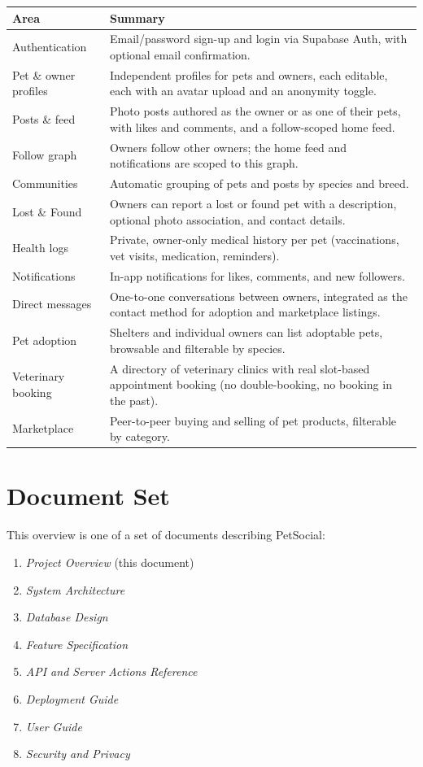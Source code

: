 \documentclass[11pt,a4paper]{article}
\begin{document}
\begin{longtable}{@{}p{4.5cm}p{9.5cm}@{}}
\toprule
\textbf{Area} & \textbf{Summary} \\
\midrule
\endhead
Authentication & Email/password sign-up and login via Supabase Auth, with optional
  email confirmation. \\
Pet \& owner profiles & Independent profiles for pets and owners, each editable, each
  with an avatar upload and an anonymity toggle. \\
Posts \& feed & Photo posts authored as the owner or as one of their pets, with likes
  and comments, and a follow-scoped home feed. \\
Follow graph & Owners follow other owners; the home feed and notifications are scoped
  to this graph. \\
Communities & Automatic grouping of pets and posts by species and breed. \\
Lost \& Found & Owners can report a lost or found pet with a description, optional
  photo association, and contact details. \\
Health logs & Private, owner-only medical history per pet (vaccinations, vet visits,
  medication, reminders). \\
Notifications & In-app notifications for likes, comments, and new followers. \\
Direct messages & One-to-one conversations between owners, integrated as the contact
  method for adoption and marketplace listings. \\
Pet adoption & Shelters and individual owners can list adoptable pets, browsable and
  filterable by species. \\
Veterinary booking & A directory of veterinary clinics with real slot-based appointment
  booking (no double-booking, no booking in the past). \\
Marketplace & Peer-to-peer buying and selling of pet products, filterable by category. \\
\bottomrule
\end{longtable}

\section{Document Set}
This overview is one of a set of documents describing PetSocial:
\begin{enumerate}[leftmargin=*]
  \item \emph{Project Overview} (this document)
  \item \emph{System Architecture}
  \item \emph{Database Design}
  \item \emph{Feature Specification}
  \item \emph{API and Server Actions Reference}
  \item \emph{Deployment Guide}
  \item \emph{User Guide}
  \item \emph{Security and Privacy}
\end{enumerate}
\end{document}
